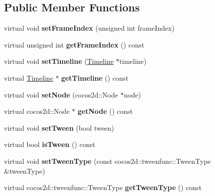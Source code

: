 \subsection*{Public Member Functions}
\begin{DoxyCompactItemize}
\item 
\mbox{\label{classFrame_a9de1ee01d3e5734bdf7723c296d43bd9}} 
virtual void {\bfseries set\+Frame\+Index} (unsigned int frame\+Index)
\item 
\mbox{\label{classFrame_a9d2806d5116802c7033c8a582c01dc2e}} 
virtual unsigned int {\bfseries get\+Frame\+Index} () const
\item 
\mbox{\label{classFrame_a8170adc5b185d39d45befb67a4539c89}} 
virtual void {\bfseries set\+Timeline} (\hyperlink{classTimeline}{Timeline} $\ast$timeline)
\item 
\mbox{\label{classFrame_a7f5032a7215c0efbc9f0f934507c3eb3}} 
virtual \hyperlink{classTimeline}{Timeline} $\ast$ {\bfseries get\+Timeline} () const
\item 
\mbox{\label{classFrame_aa7dc697fe3d6088636534400c124f90a}} 
virtual void {\bfseries set\+Node} (cocos2d\+::\+Node $\ast$node)
\item 
\mbox{\label{classFrame_a5556e5414edf43d29a5b50e07cfa7fbf}} 
virtual cocos2d\+::\+Node $\ast$ {\bfseries get\+Node} () const
\item 
\mbox{\label{classFrame_a7e53fcdd7916ae2e8eec820c49734593}} 
virtual void {\bfseries set\+Tween} (bool tween)
\item 
\mbox{\label{classFrame_a65760eff8f5bfb02345d4fa12c1dad6e}} 
virtual bool {\bfseries is\+Tween} () const
\item 
\mbox{\label{classFrame_a513f0deccaaee9745f5f4e99cf587dff}} 
virtual void {\bfseries set\+Tween\+Type} (const cocos2d\+::tweenfunc\+::\+Tween\+Type \&tween\+Type)
\item 
\mbox{\label{classFrame_a987c9ebe3f572027845925c6eee1c355}} 
virtual cocos2d\+::tweenfunc\+::\+Tween\+Type {\bfseries get\+Tween\+Type} () const

\end{DoxyCompactItemize}
